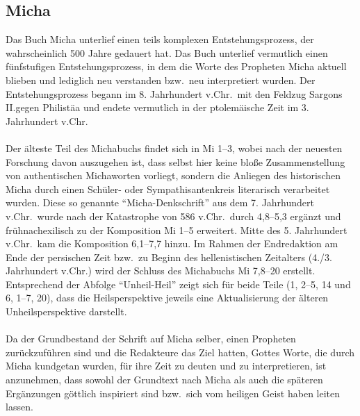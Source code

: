 \subsection*{Micha}
Das Buch Micha unterlief einen teils komplexen Entstehungsprozess, der wahrscheinlich 500 Jahre gedauert hat. Das Buch unterlief vermutlich einen fünfstufigen Entstehungsprozess, in dem die Worte des Propheten Micha aktuell blieben und lediglich neu verstanden bzw.\ neu interpretiert wurden. Der Entstehungsprozess begann im 8. Jahrhundert v.Chr.\ mit den Feldzug Sargons II.\@ gegen Philistäa und endete vermutlich in der ptolemäische Zeit im 3. Jahrhundert v.Chr.
\\~\\
Der älteste Teil des Michabuchs findet sich in Mi 1--3, wobei nach der neuesten Forschung davon auszugehen ist, dass selbst hier keine bloße Zusammenstellung von authentischen Michaworten vorliegt, sondern die Anliegen des historischen Micha durch einen Schüler- oder Sympathisantenkreis literarisch verarbeitet wurden. Diese so genannte ``Micha-Denkschrift'' aus dem 7. Jahrhundert v.Chr.\ wurde nach der Katastrophe von 586 v.Chr.\ durch 4,8--5,3 ergänzt und frühnachexilisch zu der Komposition Mi 1--5 erweitert. Mitte des 5. Jahrhundert v.Chr.\ kam die Komposition 6,1--7,7 hinzu. Im Rahmen der Endredaktion am Ende der persischen Zeit bzw.\ zu Beginn des hellenistischen Zeitalters (4./3. Jahrhundert v.Chr.) wird der Schluss des Michabuchs Mi 7,8--20 erstellt. Entsprechend der Abfolge ``Unheil-Heil'' zeigt sich für beide Teile (1, 2--5, 14 und 6, 1--7, 20), dass die Heilsperspektive jeweils eine Aktualisierung der älteren Unheilsperspektive darstellt.
\\~\\
Da der Grundbestand der Schrift auf Micha selber, einen Propheten zurückzuführen sind und die Redakteure das Ziel hatten, Gottes Worte, die durch Micha kundgetan wurden, für ihre Zeit zu deuten und zu interpretieren, ist anzunehmen, dass sowohl der Grundtext nach Micha als auch die späteren Ergänzungen göttlich inspiriert sind bzw.\ sich vom heiligen Geist haben leiten lassen.

